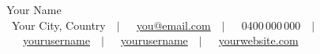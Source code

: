 \begin{center}
  {\fontsize{36pt}{39.6pt}\selectfont\displayfont Your Name}\\[5pt]
  \small
  \faMapMarker*~Your City, Country\ \ $|$\ \
  \faEnvelope~\href{mailto:you@email.com}{you@email.com}\ \ $|$\ \
  \faMobile*~0400\,000\,000\ \ $|$\ \
  \faLinkedin~\href{https://linkedin.com/in/yourusername}{yourusername}\ \ $|$\ \
  \faGithub~\href{https://github.com/yourusername}{yourusername}\ \ $|$\ \
  \faGlobe~\href{https://yourwebsite.com}{yourwebsite.com}
\end{center}
\vspace{4pt}
